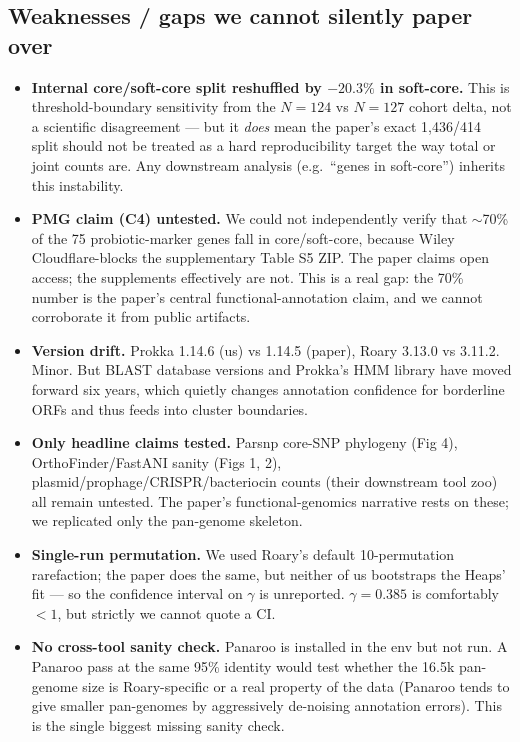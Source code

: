 \documentclass[11pt,letterpaper]{article}
\begin{document}
\subsection{Weaknesses / gaps we cannot silently paper over}
\begin{itemize}
  \item \textbf{Internal core/soft-core split reshuffled by $-20.3\%$ in soft-core.}
        This is threshold-boundary sensitivity from the $N=124$ vs $N=127$ cohort
        delta, not a scientific disagreement --- but it \emph{does} mean the paper's
        exact 1{,}436/414 split should not be treated as a hard reproducibility target
        the way total or joint counts are. Any downstream analysis (e.g.\ ``genes in
        soft-core'') inherits this instability.
  \item \textbf{PMG claim (C4) untested.} We could not independently verify that
        $\sim$70\% of the 75 probiotic-marker genes fall in core/soft-core, because
        Wiley Cloudflare-blocks the supplementary Table S5 ZIP. The paper claims
        open access; the supplements effectively are not. This is a real gap: the
        70\% number is the paper's central functional-annotation claim, and we
        cannot corroborate it from public artifacts.
  \item \textbf{Version drift.} Prokka 1.14.6 (us) vs 1.14.5 (paper), Roary 3.13.0 vs 3.11.2.
        Minor. But BLAST database versions and Prokka's HMM library have moved
        forward six years, which quietly changes annotation confidence for
        borderline ORFs and thus feeds into cluster boundaries.
  \item \textbf{Only headline claims tested.} Parsnp core-SNP phylogeny (Fig 4),
        OrthoFinder/FastANI sanity (Figs 1, 2), plasmid/prophage/CRISPR/bacteriocin
        counts (their downstream tool zoo) all remain untested. The paper's
        functional-genomics narrative rests on these; we replicated only the
        pan-genome skeleton.
  \item \textbf{Single-run permutation.} We used Roary's default 10-permutation
        rarefaction; the paper does the same, but neither of us bootstraps
        the Heaps' fit --- so the confidence interval on $\gamma$ is unreported.
        $\gamma = 0.385$ is comfortably $< 1$, but strictly we cannot quote a CI.
  \item \textbf{No cross-tool sanity check.} Panaroo is installed in the env but not
        run. A Panaroo pass at the same 95\% identity would test whether the
        16.5k pan-genome size is Roary-specific or a real property of the data
        (Panaroo tends to give smaller pan-genomes by aggressively de-noising
        annotation errors). This is the single biggest missing sanity check.
\end{itemize}
\end{document}

